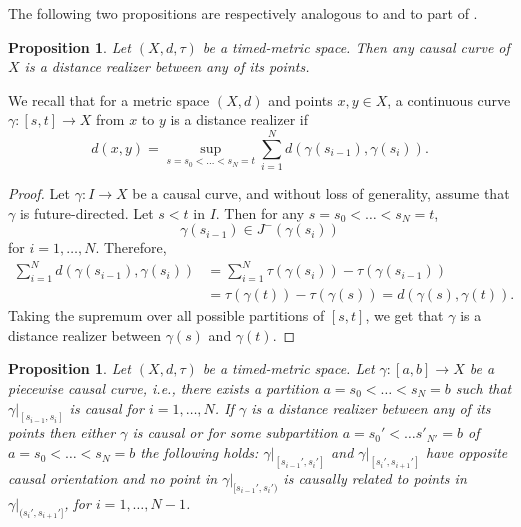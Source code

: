 \documentclass[a4paper,12pt,reqno]{amsart}
\theoremstyle{plain}
\newtheorem{prop}[thm]{Proposition}
\begin{document}
The following two propositions are respectively analogous to \cite[Corollary~3.19]{SV-Null} and to part of \cite[Lemma~3.20]{SV-Null}. 

 


\begin{prop}\label{prop:causal curves are realizers}
Let $(X,d,\tau)$ be a timed-metric space. Then any causal curve of $X$ is a distance realizer between any of its points. 
\end{prop}

We recall that for a metric space $(X,d)$ and points $x,y \in X$, a continuous curve $\gamma : [s,t] \to X$ from 
$x$ to $y$ is a distance realizer if 
\[
d(x,y)= \sup_{s=s_0<\dots < s_N =t} \sum_{i=1}^{N} d(\gamma(s_{i-1}),\gamma(s_i)).
\]

\begin{proof}
Let $\gamma\colon I\to X$ be a causal curve, and without loss of generality, assume that $\gamma$ is future-directed. Let $s<t$ in $I$. Then for any $s= s_0 < \dots < s_N = t$, 
\[
\gamma(s_{i-1}) \in J^-(\gamma(s_i))
\]
for $i=1,\dots, N$. Therefore,  
\begin{align*}
\sum_{i=1}^{N} d(\gamma(s_{i-1}),\gamma(s_i)) &= \sum_{i=1}^{N} \tau(\gamma(s_i))-\tau(\gamma(s_{i-1})) \\
&= \tau(\gamma(t))-\tau(\gamma(s)) = d(\gamma(s),\gamma(t)).
\end{align*}
Taking the supremum over all possible partitions of 
$[s,t]$, we get that 
$\gamma$ is a distance realizer between $\gamma(s)$ and $\gamma(t)$.
\end{proof}


\begin{prop}\label{prop:piecewise causal realizers}
Let $(X,d,\tau)$ be a timed-metric space. Let $\gamma\colon [a,b]\to X$ be a piecewise causal curve, i.e., there exists a partition $a=s_0<\dots <s_N=b$ such that $\gamma|_{[s_{i-1},s_i]}$ is causal for $i=1,\dots, N$. If $\gamma$ is a distance realizer between any of its points then either $\gamma$ is causal or for some subpartition $a = s_0' <\dots s'_{N'} =b$ of $a=s_0<\dots <s_N=b$ the following holds: $\gamma|_{[s_{i-1}',s_i']}$ and $\gamma|_{[s_i',s_{i+1}']}$ have opposite causal orientation and no point in $\gamma|_{[s_{i-1}',s_i')}$ is causally related to points in $\gamma|_{(s_{i}',s_{i+1}']}$, for $i=1,\dots, N-1$.
\end{prop}
\end{document}
